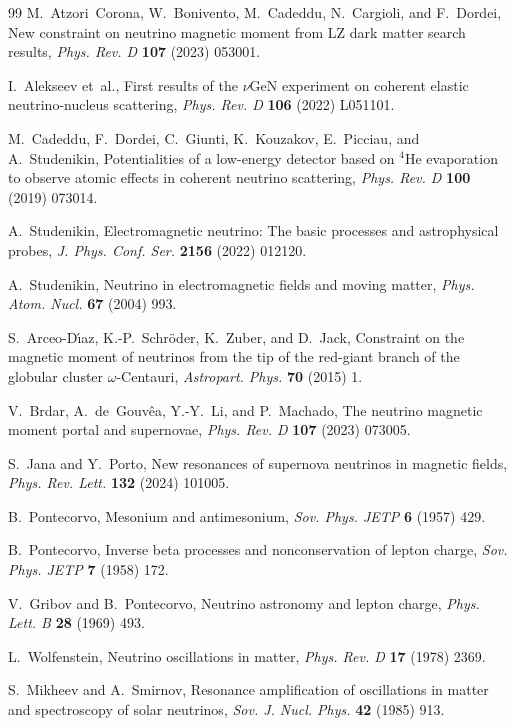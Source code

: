 \documentclass[a4paper,11pt]{article}
\begin{document}
\begin{thebibliography}{99}
M.~Atzori~Corona, W.~Bonivento, M.~Cadeddu, N.~Cargioli, and F.~Dordei,
New constraint on neutrino magnetic moment from LZ dark matter search results,
{\em Phys. Rev. D} {\bf 107} (2023) 053001.

I.~Alekseev et~al.,
First results of the $\nu$GeN experiment on coherent elastic neutrino-nucleus scattering,
{\em Phys. Rev. D} {\bf 106} (2022) L051101.

M.~Cadeddu, F.~Dordei, C.~Giunti, K.~Kouzakov, E.~Picciau, and A.~Studenikin,
Potentialities of a low-energy detector based on $^4$He evaporation to observe atomic effects in coherent neutrino scattering,
{\em Phys. Rev. D} {\bf 100} (2019) 073014.

A.~Studenikin,
Electromagnetic neutrino: The basic processes and astrophysical probes,
{\em J. Phys. Conf. Ser.} {\bf 2156} (2022) 012120.

A.~Studenikin,
Neutrino in electromagnetic fields and moving matter,
{\em Phys. Atom. Nucl.} {\bf 67} (2004) 993.

S.~Arceo-D\'{\i}az, K.-P.~Schr\"{o}der, K.~Zuber, and D.~Jack,
Constraint on the magnetic moment of neutrinos from the tip of the red-giant branch of the globular cluster $\omega$-Centauri,
{\em Astropart. Phys.} {\bf 70} (2015) 1.

V.~Brdar, A.~de~Gouv\^{e}a, Y.-Y.~Li, and P.~Machado,
The neutrino magnetic moment portal and supernovae,
{\em Phys. Rev. D} {\bf 107} (2023) 073005.

S.~Jana and Y.~Porto,
New resonances of supernova neutrinos in magnetic fields,
{\em Phys. Rev. Lett.} {\bf 132} (2024) 101005.

B.~Pontecorvo,
Mesonium and antimesonium,
{\em Sov. Phys. JETP} {\bf 6} (1957) 429.

B.~Pontecorvo,
Inverse beta processes and nonconservation of lepton charge,
{\em Sov. Phys. JETP} {\bf 7} (1958) 172.

V.~Gribov and B.~Pontecorvo,
Neutrino astronomy and lepton charge,
{\em Phys. Lett. B} {\bf 28} (1969) 493.

L.~Wolfenstein,
Neutrino oscillations in matter,
{\em Phys. Rev. D} {\bf 17} (1978) 2369.

S.~Mikheev and A.~Smirnov,
Resonance amplification of oscillations in matter and spectroscopy of solar neutrinos,
{\em Sov. J. Nucl. Phys.} {\bf 42} (1985) 913.


\end{thebibliography}
\end{document}
